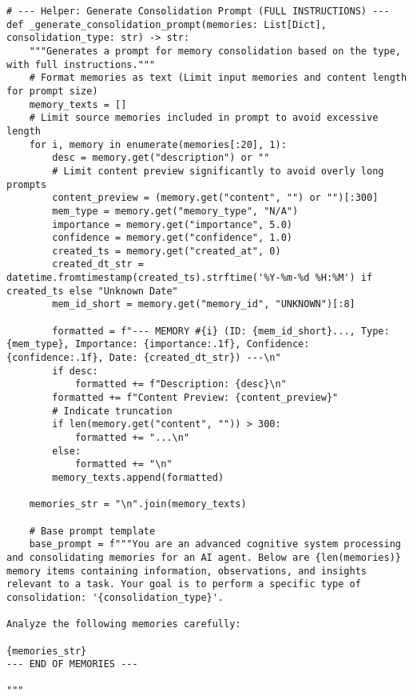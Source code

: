 \documentclass[12pt,a4paper]{article}
\begin{document}
\begin{pageablecode}
\begin{verbatim}
# --- Helper: Generate Consolidation Prompt (FULL INSTRUCTIONS) ---
def _generate_consolidation_prompt(memories: List[Dict], consolidation_type: str) -> str:
    """Generates a prompt for memory consolidation based on the type, with full instructions."""
    # Format memories as text (Limit input memories and content length for prompt size)
    memory_texts = []
    # Limit source memories included in prompt to avoid excessive length
    for i, memory in enumerate(memories[:20], 1):
        desc = memory.get("description") or ""
        # Limit content preview significantly to avoid overly long prompts
        content_preview = (memory.get("content", "") or "")[:300]
        mem_type = memory.get("memory_type", "N/A")
        importance = memory.get("importance", 5.0)
        confidence = memory.get("confidence", 1.0)
        created_ts = memory.get("created_at", 0)
        created_dt_str = datetime.fromtimestamp(created_ts).strftime('%Y-%m-%d %H:%M') if created_ts else "Unknown Date"
        mem_id_short = memory.get("memory_id", "UNKNOWN")[:8]

        formatted = f"--- MEMORY #{i} (ID: {mem_id_short}..., Type: {mem_type}, Importance: {importance:.1f}, Confidence: {confidence:.1f}, Date: {created_dt_str}) ---\n"
        if desc:
            formatted += f"Description: {desc}\n"
        formatted += f"Content Preview: {content_preview}"
        # Indicate truncation
        if len(memory.get("content", "")) > 300:
            formatted += "...\n"
        else:
            formatted += "\n"
        memory_texts.append(formatted)

    memories_str = "\n".join(memory_texts)

    # Base prompt template
    base_prompt = f"""You are an advanced cognitive system processing and consolidating memories for an AI agent. Below are {len(memories)} memory items containing information, observations, and insights relevant to a task. Your goal is to perform a specific type of consolidation: '{consolidation_type}'.

Analyze the following memories carefully:

{memories_str}
--- END OF MEMORIES ---

"""


\end{verbatim}
\end{pageablecode}
\end{document}
